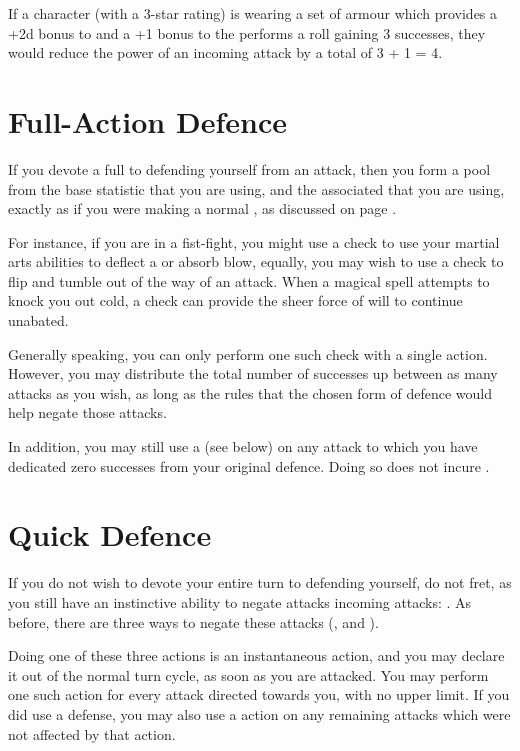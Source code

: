 If a character (with a 3-star  rating) is wearing a set of armour which provides a +2d bonus to  and a +1 bonus to the  performs a  roll gaining 3 successes, they would reduce the power of an incoming attack by a total of 3 + 1 = 4.  

\section{Full-Action Defence}

If you devote a full  to defending yourself from an attack, then you form a pool from the base  statistic that you are using, and the associated  that you are using, exactly as if you were making a normal , as discussed on page \pageref{C:Checks}.

For instance, if you are in a fist-fight, you might use a  check to use your martial arts abilities to deflect a or absorb blow, equally, you may wish to use a  check to flip and tumble out of the way of an attack. When a magical spell attempts to knock you out cold, a  check can provide the sheer force of will to continue unabated. 

Generally speaking, you can only perform one such check with a single action. However, you may distribute the total number of successes up between as many attacks as you wish, as long as the  rules that the chosen form of defence would help negate those attacks. 

In addition, you may still use a  (see below) on any attack to which you have dedicated zero successes from your original defence. Doing so does not incure . 


\section{Quick Defence}

If you do not wish to devote your entire turn to defending yourself, do not fret, as you still have an instinctive ability to negate attacks incoming attacks: . As before, there are three ways to negate these attacks (,  and ).

Doing one of these three actions is an instantaneous action, and you may declare it out of the normal turn cycle, as soon as you are attacked. You may perform one such action for every attack directed towards you, with no upper limit. If you did use a  defense, you may also use a  action on any remaining attacks which were not affected by that action.

